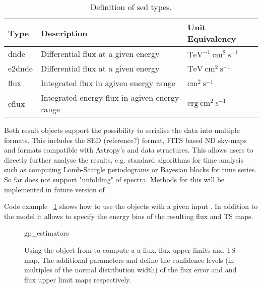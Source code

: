 \begin{table*}
    \begin{center}
        \begin{tabular}{lll}
         \hline
         Type & Description & Unit Equivalency \\
         \hline
         dnde & Differential flux at a given energy & $\mathrm{TeV^{-1}~cm^{2}~s^{-1}}$ \\
         e2dnde & Differential flux at a given energy  & $\mathrm{TeV~cm^{2}~s^{-1}}$ \\
         flux & Integrated flux in agiven energy range & $\mathrm{cm^{2}~s^{-1}}$ \\
         eflux & Integrated energy flux in agiven energy range & $\mathrm{erg~cm^{2}~s^{-1}}$\\
         \hline
        \end{tabular}
    \end{center}
    \label{tab:sed_types}
    \caption{Definition of sed types.}
\end{table*}


Both result objects support the possibility to serialise
the data into multiple formats. This includes the
\gadf SED (reference?) format, FITS based ND sky-maps
and formats compatible with Astropy's  and
 data structures. This allows
users to directly further analyse the results, e.g.
standard algorithms for time analysis such as
computing Lomb-Scargle periodograms or Bayesian
blocks for time series. So far \gammapy does not
support "unfolding" of \gammaray spectra.
Methods for this will be implemented in future version of \gammapy.

Code example ~\ref{fig*:minted:gp_estimators} shows how to use
the  objects with a given input .
In addition to the model it allows to specify the energy
bins of the resulting flux and TS maps.


\begin{figure}
	{gp_estimators}
	\caption{Using the  object from  to compute a
        a flux, flux upper limits and TS map. The additional parameters 
        and  define the confidence levels (in multiples of the normal distribution width)
        of the flux error and and flux upper limit maps respectively.
    }
    \label{fig*:minted:gp_estimators}
\end{figure}
